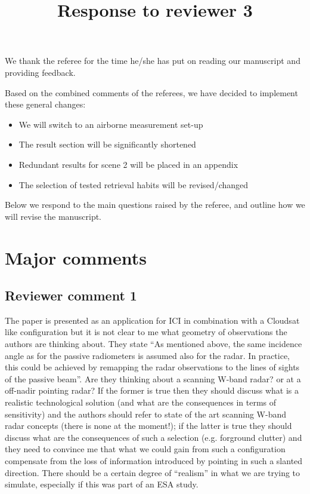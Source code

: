 \documentclass[11pt]{scrartcl}
\author{}
\date{}
\title{Response to reviewer 3}
\begin{document}
\maketitle

\setlength{\parindent}{0cm}

We thank the referee for the time he/she has put on reading our manuscript and
providing feedback.

Based on the combined comments of the referees, we have decided to implement
these general changes:

\begin{itemize}
\item We will switch to an airborne measurement set-up
\item The  result section will be significantly shortened
\item Redundant results for scene 2 will be placed in an appendix
\item The selection of tested retrieval habits will be revised/changed
\end{itemize}

Below we respond to the main questions raised by the referee, and outline how we
will revise the manuscript.

\section*{Major comments}

\subsection*{Reviewer comment 1}

The paper is presented as an application for ICI in combination with a
Cloudsat like configuration but it is not clear to me what geometry of
observations the authors are thinking about. They state “As mentioned above, the
same incidence angle as for the passive radiometers is assumed also for the
radar. In practice, this could be achieved by remapping the radar observations to
the lines of sights of the passive beam”. Are they thinking about a scanning
W-band radar? or at a off-nadir pointing radar? If the former is true then they
should discuss what is a realistic technological solution (and what are the
consequences in terms of sensitivity) and the authors should refer to state of
the art scanning W-band radar concepts (there is none at the moment!); if the
latter is true they should discuss what are the consequences of such a selection
(e.g. forground clutter) and they need to convince me that what we could gain
from such a configuration compensate from the loss of information introduced by
pointing in such a slanted direction. There should be a certain degree of
“realism” in what we are trying to simulate, especially if this was part of an
ESA study.
\end{document}
